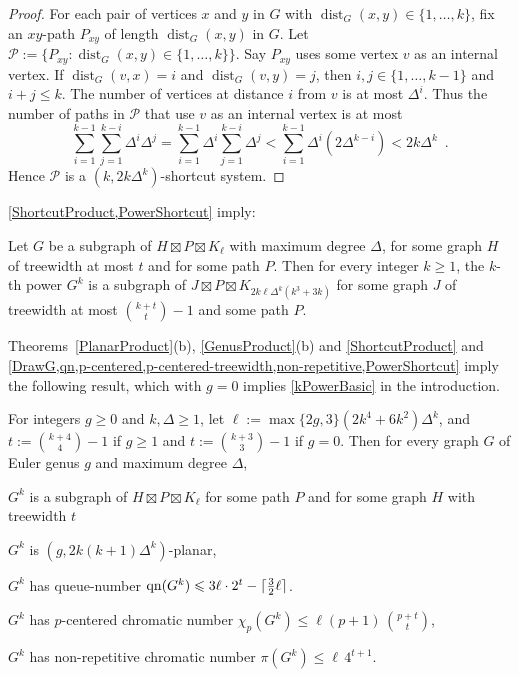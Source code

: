 \documentclass{patmorin}
\DeclareMathOperator{\dist}{dist}
\DeclareMathOperator{\qn}{qn}
\DeclarePairedDelimiter{\ceil}{\lceil}{\rceil}
\newcommand{\PP}{\mathcal{P}}
\renewcommand{\geq}{\geqslant}
\renewcommand{\leq}{\leqslant}
\begin{document}
\begin{proof}
For each pair of vertices $x$ and $y$ in $G$ with $\dist_G(x,y)\in\{1,\dots,k\}$, fix an $xy$-path $P_{xy}$ of length
$\dist_G(x,y)$  in $G$. Let $\PP:=\{P_{xy}: \dist_G(x,y)\in\{1,\dots,k\} \}$. Say $P_{xy}$ uses some vertex $v$ as an internal vertex. If $\dist_G(v,x)=i$ and $\dist_G(v,y)=j$, then $i,j\in\{1,\dots,k-1\}$ and $i+j\leq k$. The number of vertices at distance $i$ from $v$ is at most $\Delta^i$. Thus the number of paths in $\PP$ that use $v$ as an internal vertex is at most
\[\sum_{i=1}^{k-1} \sum_{j=1}^{k-i} \Delta^i\Delta^j
= \sum_{i=1}^{k-1} \Delta^i \sum_{j=1}^{k-i} \Delta^j
< \sum_{i=1}^{k-1} \Delta^i ( 2 \Delta^{k-i} )
< 2k \Delta^k\enspace.\]
Hence $\PP$ is a $(k, 2k \Delta^k)$-shortcut system.
\end{proof}

\cref{ShortcutProduct,PowerShortcut} imply:

\begin{thm}
\label{PowerProduct}
Let $G$ be a subgraph of $H\boxtimes P\boxtimes K_\ell$ with maximum degree $\Delta$, for some graph $H$ of treewidth at most $t$ and for some path $P$. Then for every integer $k\geq 1$, the $k$-th power $G^k$ is a subgraph of $J\boxtimes P\boxtimes K_{2k \ell \Delta^{k}(k^3+3k)}$ for some graph $J$ of treewidth at most $\binom{k+t}{t}-1$ and some path $P$.
\end{thm}


Theorems~\ref{PlanarProduct}(b), \ref{GenusProduct}(b) and \cref{ShortcutProduct} and  \cref{DrawG,qn,p-centered,p-centered-treewidth,non-repetitive,PowerShortcut} imply the following result, which with $g=0$ implies  \cref{kPowerBasic} in the introduction.

\begin{thm}
\label{PowerGenus}
For integers $g\geq 0$ and $k,\Delta\geq 1$, let $\ell:= \max\{2g,3\} (2k^4+6k^2) \Delta^{k}$, and $t:= \binom{k+4}{4}-1$ if $g\geq 1$ and $t:= \binom{k+3}{3}-1$ if $g=0$. Then for every graph $G$ of Euler genus $g$ and maximum degree $\Delta$, 
\begin{compactitem}
\item $G^k$ is a subgraph of $H\boxtimes P \boxtimes K_{\ell}$ for some path $P$ and for some graph $H$ with treewidth $t$ 
\item $G^k$ is $(g, 2k(k+1)\Delta^{k} )$-planar,
\item $G^k$ has queue-number $\qn(G^k) \leq 3 \ell \cdot 2^t - \ceil{\tfrac{3}{2}\ell}$. 
\item $G^k$ has  $p$-centered chromatic number $\chi_p(G^k) \leq \ell (p+1)\,  \binom{p+t}{t}$, 
\item $G^k$ has  non-repetitive chromatic number $ \pi(G^k) \leq \ell \, 4^{t+1}$.
\end{compactitem}
\end{thm}
\end{document}
